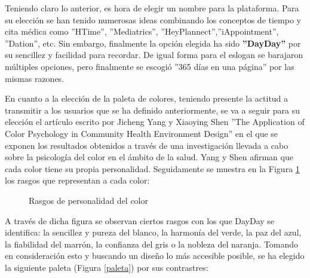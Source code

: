 Teniendo claro lo anterior, es hora de elegir un nombre para la plataforma. Para su elección se han tenido numerosas ideas combinando los conceptos de tiempo y cita médica como ''HTime'', ''Mediatrics'', ''HeyPlannect'',''iAppointment'', ''Dation'', etc. Sin embargo, finalmente la opción elegida ha sido \textbf{''DayDay''} por su sencillez y facilidad para recordar. De igual forma para el eslogan se barajaron múltiples opciones, pero finalmente se escogió ''365 días en una página'' por las mismas razones. \bigskip

En cuanto a la elección de la paleta de colores, teniendo presente la actitud a transmitir a los usuarios que se ha definido anteriormente, se va a seguir para su elección el artículo escrito por Jicheng Yang y Xiaoying Shen ''The Application of Color Psychology in Community Health
Environment Design'' \cite{Yang2022} en el que se exponen los resultados obtenidos a través de una investigación llevada a cabo sobre la psicología del color en el ámbito de la salud. Yang y Shen afirman que cada color tiene su propia personalidad. Seguidamente se muestra en la Figura \ref{psicologia-color} los rasgos que representan a cada color:

\begin{figure}[H]
    \caption{Rasgos de personalidad del color \cite{Yang2022}}
    \label{psicologia-color}
\end{figure}

A través de dicha figura se observan ciertos rasgos con los que DayDay se identifica: la sencillez y pureza del blanco, la harmonía del verde, la paz del azul, la fiabilidad del marrón, la confianza del gris o la nobleza del naranja. Tomando en consideración esto y buscando un diseño lo más accesible posible, se ha elegido la siguiente paleta (Figura \ref{paleta}) por sus contrastres:

